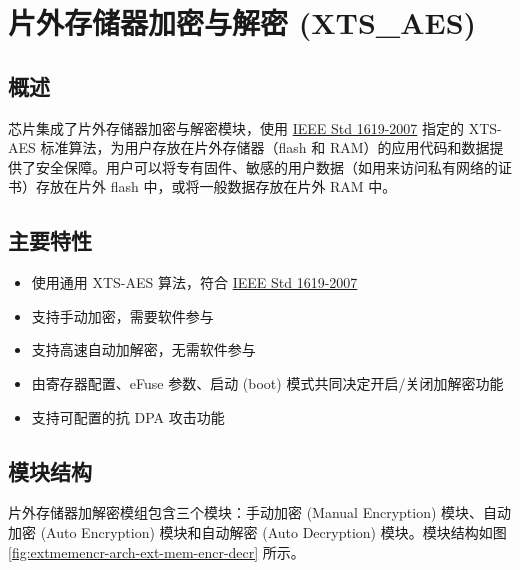 \documentclass[main\_\_CN.tex]{subfiles}
\begin{document}

\ifglobal
\else
    {\let\clearpage\relax \listoftodos}
    {\let\clearpage\relax \listofdonetodos}
    \tableofcontents
\fi



\hypertarget{extmemencr}{}
\chapter{片外存储器加密与解密 (XTS\_AES)}
\label{mod:extmemencr}


\section{概述}

\chipname{} 芯片集成了片外存储器加密与解密模块，使用 \href{https://ieeexplore.ieee.org/document/4493450}{IEEE Std 1619-2007} 指定的 XTS-AES 标准算法，为用户存放在片外存储器（flash 和 RAM）的应用代码和数据提供了安全保障。用户可以将专有固件、敏感的用户数据（如用来访问私有网络的证书）存放在片外 flash 中，或将一般数据存放在片外 RAM 中。

\section{主要特性}

\begin{itemize}
    \item 使用通用 XTS-AES 算法，符合 \href{https://ieeexplore.ieee.org/document/4493450}{IEEE Std 1619-2007}
    \item 支持手动加密，需要软件参与
    \item 支持高速自动加解密，无需软件参与
    \item 由寄存器配置、eFuse 参数、启动 (boot) 模式共同决定开启/关闭加解密功能
    \item 支持可配置的抗 DPA 攻击功能
\end{itemize}


\section{模块结构}
片外存储器加解密模组包含三个模块：手动加密 (Manual Encryption) 模块、自动加密 (Auto Encryption) 模块和自动解密 (Auto Decryption) 模块。模块结构如图 \ref{fig:extmemencr-arch-ext-mem-encr-decr} 所示。
\end{document}
